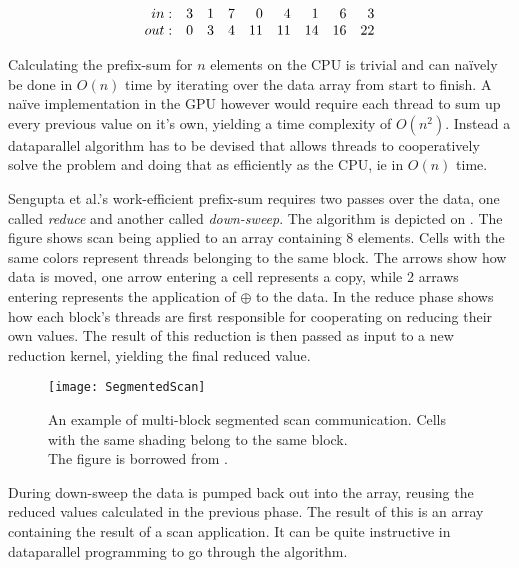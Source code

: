 \begin{displaymath}
  \begin{array}{r r r r r r r r r}
    in: & 3 & 1 & 7 & 0 & 4 & 1 & 6 & 3 \\
    out: & 0 & 3 & 4 & 11 & 11 & 14 & 16 & 22 \\
  \end{array}
\end{displaymath}

Calculating the prefix-sum for $n$ elements on the CPU is trivial and
can naïvely be done in $O(n)$ time by iterating over the data array
from start to finish. A naïve implementation in the GPU however would
require each thread to sum up every previous value on it's own,
yielding a time complexity of $O(n^2)$. Instead a dataparallel
algorithm has to be devised that allows threads to cooperatively solve
the problem and doing that as efficiently as the CPU, ie in $O(n)$
time.



Sengupta et al.'s work-efficient prefix-sum
requires two passes over the data, one called \textit{reduce} and
another called \textit{down-sweep}. The algorithm is depicted on
. The figure shows scan being applied to an array
containing 8 elements. Cells with the same colors represent threads
belonging to the same block. The arrows show how data is moved, one
arrow entering a cell represents a copy, while 2 arraws entering
represents the application of $\oplus$ to the data. In the reduce
phase  shows how each block's threads are first
responsible for cooperating on reducing their own values. The result
of this reduction is then passed as input to a new reduction kernel,
yielding the final reduced value.

\begin{figure}
  \centering
  \texttt{[image: SegmentedScan]}

  \parbox{5cm}{\caption[Multi-block segmented scan communication.]{An
      example of multi-block segmented scan communication. Cells with
      the same shading belong to the same block. \\The figure is
      borrowed from .}\label{fig:segScan}}
\end{figure}

During down-sweep the data is pumped back out into the array, reusing
the reduced values calculated in the previous phase. The result of
this is an array containing the result of a scan application. It can
be quite instructive in dataparallel programming to go through the
algorithm.

